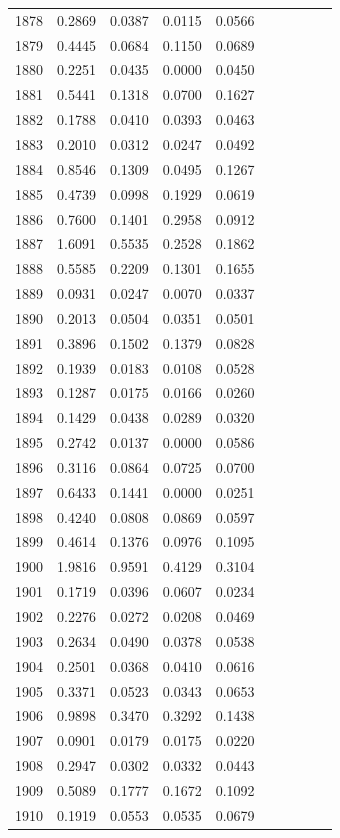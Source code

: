 \begin{table}
\begin{tabular}{cccccccccc}
1878& 0.2869& 0.0387& 0.0115& 0.0566\\ 
1879& 0.4445& 0.0684& 0.1150& 0.0689\\ 
1880& 0.2251& 0.0435& 0.0000& 0.0450\\ 
1881& 0.5441& 0.1318& 0.0700& 0.1627\\ 
1882& 0.1788& 0.0410& 0.0393& 0.0463\\ 
1883& 0.2010& 0.0312& 0.0247& 0.0492\\ 
1884& 0.8546& 0.1309& 0.0495& 0.1267\\ 
1885& 0.4739& 0.0998& 0.1929& 0.0619\\ 
1886& 0.7600& 0.1401& 0.2958& 0.0912\\ 
1887& 1.6091& 0.5535& 0.2528& 0.1862\\ 
1888& 0.5585& 0.2209& 0.1301& 0.1655\\ 
1889& 0.0931& 0.0247& 0.0070& 0.0337\\ 
1890& 0.2013& 0.0504& 0.0351& 0.0501\\ 
1891& 0.3896& 0.1502& 0.1379& 0.0828\\ 
1892& 0.1939& 0.0183& 0.0108& 0.0528\\ 
1893& 0.1287& 0.0175& 0.0166& 0.0260\\ 
1894& 0.1429& 0.0438& 0.0289& 0.0320\\ 
1895& 0.2742& 0.0137& 0.0000& 0.0586\\ 
1896& 0.3116& 0.0864& 0.0725& 0.0700\\ 
1897& 0.6433& 0.1441& 0.0000& 0.0251\\ 
1898& 0.4240& 0.0808& 0.0869& 0.0597\\ 
1899& 0.4614& 0.1376& 0.0976& 0.1095\\ 
1900& 1.9816& 0.9591& 0.4129& 0.3104\\ 
1901& 0.1719& 0.0396& 0.0607& 0.0234\\ 
1902& 0.2276& 0.0272& 0.0208& 0.0469\\ 
1903& 0.2634& 0.0490& 0.0378& 0.0538\\ 
1904& 0.2501& 0.0368& 0.0410& 0.0616\\ 
1905& 0.3371& 0.0523& 0.0343& 0.0653\\ 
1906& 0.9898& 0.3470& 0.3292& 0.1438\\ 
1907& 0.0901& 0.0179& 0.0175& 0.0220\\ 
1908& 0.2947& 0.0302& 0.0332& 0.0443\\ 
1909& 0.5089& 0.1777& 0.1672& 0.1092\\ 
1910& 0.1919& 0.0553& 0.0535& 0.0679\\ 

\end{tabular}
\end{table}
